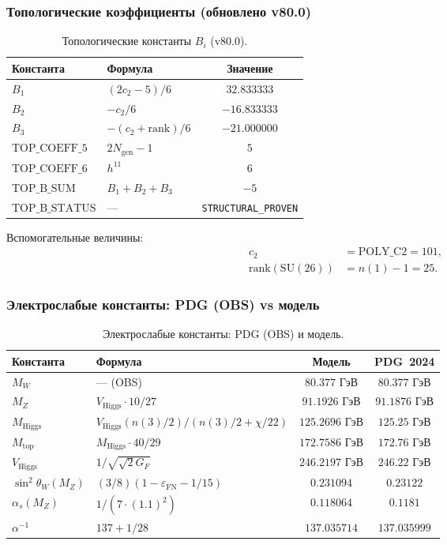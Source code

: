 \documentclass[11pt,a4paper]{article}
\newcommand{\SU}{\ensuremath{\mathrm{SU}}}
\newcommand{\Ngen}{\ensuremath{N_{\text{gen}}}}
\theoremstyle{definition}
\begin{document}
\subsubsection{Топологические коэффициенты (обновлено v80.0)}

\begin{table}[ht]
\centering
\caption{Топологические константы \texorpdfstring{$B_i$}{B\_i} (v80.0).}
\label{tab:app-bi-v80}
\begin{tabular}{llc}
\toprule
Константа & Формула & Значение \\
\midrule
$B_1$ & $(2 c_2 - 5)/6$ & $32.833333$ \\
$B_2$ & $-c_2/6$ & $-16.833333$ \\
$B_3$ & $-(c_2 + \text{rank})/6$ & $-21.000000$ \\
\midrule
$\text{TOP\_COEFF\_5}$ & $2 \Ngen - 1$ & $5$ \\
$\text{TOP\_COEFF\_6}$ & $h^{11}$ & $6$ \\
$\text{TOP\_B\_SUM}$ & $B_1 + B_2 + B_3$ & $-5$ \\
$\text{TOP\_B\_STATUS}$ & --- & \texttt{STRUCTURAL\_PROVEN} \\
\bottomrule
\end{tabular}
\end{table}
\medskip\noindent
Вспомогательные величины:
\begin{align}
    c_2 &= \text{POLY\_C2} = 101, \\
    \text{rank}(\SU(26)) &= n(1) - 1 = 25.
\end{align}

\subsubsection{Электрослабые константы: PDG (OBS) vs модель}

\begin{table}[ht]
\centering
\caption{Электрослабые константы: PDG (OBS) и модель.}
\label{tab:app-ew}
\begin{tabular}{llcc}
\toprule
Константа & Формула & Модель & PDG~2024 \\
\midrule
$M_W$ & — (OBS) & $80.377$ ГэВ & $80.377$ ГэВ \\
$M_Z$ & $V_{\text{Higgs}} \cdot 10/27$ & $91.1926$ ГэВ & $91.1876$ ГэВ \\
$M_{\text{Higgs}}$ & $V_{\text{Higgs}}(n(3)/2)/(n(3)/2+\chi/22)$
    & $125.2696$ ГэВ & $125.25$ ГэВ \\
$M_{\text{top}}$ & $M_{\text{Higgs}} \cdot 40/29$ & $172.7586$ ГэВ & $172.76$ ГэВ \\
$V_{\text{Higgs}}$ & $1/\sqrt{\sqrt{2} G_F}$ & $246.2197$ ГэВ & $246.22$ ГэВ \\
$\sin^2\theta_W(M_Z)$ & $(3/8)(1 - \varepsilon_{\text{FN}} - 1/15)$
    & $0.231094$ & $0.23122$ \\
$\alpha_s(M_Z)$ & $1/(7 \cdot (1.1)^2)$ & $0.118064$ & $0.1181$ \\
$\alpha^{-1}$ & $137 + 1/28$ & $137.035714$ & $137.035999$ \\
\bottomrule
\end{tabular}
\end{table}
\end{document}
